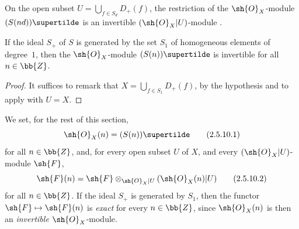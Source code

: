 \begin{corollary}[2.5.8]
\label{II.2.5.8}
On the open subset $U=\bigcup_{f\in S_d}D_+(f)$, the restriction of the $\sh{O}_X$-module $(S(nd))\supertilde$ is an invertible $(\sh{O}_X|U)$-module .
\end{corollary}

\begin{corollary}[2.5.9]
\label{II.2.5.9}
If the ideal $S_+$ of $S$ is generated by the set $S_1$ of homogeneous elements of degree~$1$, then the $\sh{O}_X$-module $(S(n))\supertilde$ is invertible for all $n\in\bb{Z}$.
\end{corollary}

\begin{proof}
It suffices to remark that $X=\bigcup_{f\in S_1}D_+(f)$, by the hypothesis  and to apply  with $U=X$.
\end{proof}

\begin{env}[2.5.10]
\label{II.2.5.10}
We set, for the rest of this section,
\[
\label{II.2.5.10.1}
  \sh{O}_X(n) = (S(n))\supertilde
\tag{2.5.10.1}
\]
for all $n\in\bb{Z}$, and, for every open subset $U$ of $X$, and every $(\sh{O}_X|U)$-module $\sh{F}$,
\[
\label{II.2.5.10.2}
  \sh{F}(n) = \sh{F}\otimes_{\sh{O}_X|U}(\sh{O}_X(n)|U)
\tag{2.5.10.2}
\]
for all $n\in\bb{Z}$.
If the ideal $S_+$ is generated by $S_1$, then the functor $\sh{F}\mapsto\sh{F}(n)$ is \emph{exact} for every $n\in\bb{Z}$, since $\sh{O}_X(n)$ is then an \emph{invertible} $\sh{O}_X$-module.
\end{env}


